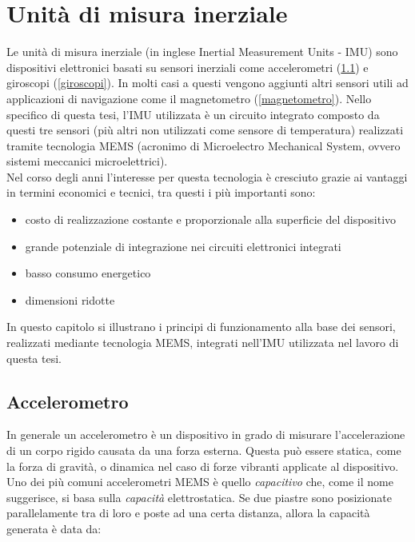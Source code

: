 \chapter{Unità di misura inerziale}
\label{tecnologie}
Le unità di misura inerziale \cite{mems} (in inglese Inertial Measurement Units - IMU) sono dispositivi elettronici basati su sensori inerziali come accelerometri (\ref{accell}) e giroscopi (\ref{giroscopi}). In molti casi a questi vengono aggiunti altri sensori utili ad applicazioni di navigazione come il magnetometro (\ref{magnetometro}). Nello specifico di questa tesi, l'IMU utilizzata è un circuito integrato composto da questi tre sensori (più altri non utilizzati come sensore di temperatura) realizzati tramite tecnologia MEMS (acronimo di Microelectro Mechanical System, ovvero sistemi meccanici microelettrici).\\
Nel corso degli anni l'interesse per questa tecnologia è cresciuto grazie ai vantaggi in termini economici e tecnici, tra questi i più importanti sono:
\begin{itemize}
	\item costo di realizzazione costante e proporzionale alla superficie del dispositivo
	\item grande potenziale di integrazione nei circuiti elettronici integrati
	\item basso consumo energetico
	\item dimensioni ridotte
\end{itemize}
 
 In questo capitolo si illustrano i principi di funzionamento alla base dei sensori, realizzati mediante tecnologia MEMS, integrati nell'IMU utilizzata nel lavoro di questa tesi.



\section{Accelerometro}
\label{accell}
In generale un accelerometro è un dispositivo in grado di misurare l’accelerazione di un corpo rigido causata da una forza esterna. Questa può essere statica, come la forza di gravità, o dinamica nel caso di forze vibranti applicate al dispositivo.\\
Uno dei più comuni accelerometri MEMS è quello \textit{capacitivo} che, come il nome suggerisce, si basa sulla \textit{capacità} elettrostatica. Se due piastre sono posizionate parallelamente tra di loro e poste ad una certa distanza, allora la capacità generata è data da:

